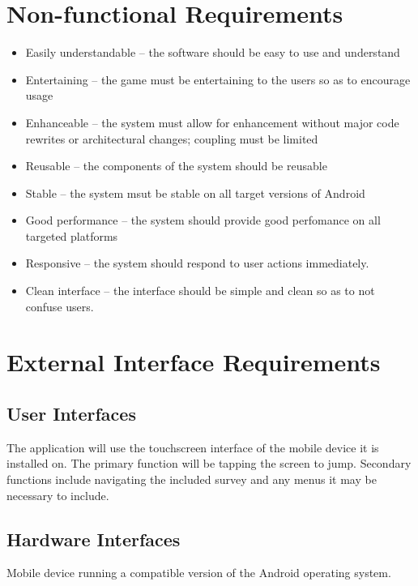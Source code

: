 \documentclass[a4wide]{article}
\begin{document}
\section{Non-functional Requirements}
\begin{itemize}
\item Easily understandable -- the software should be easy to use and understand
\item Entertaining -- the game must be entertaining to the users so as to
encourage usage
\item Enhanceable -- the system must allow for enhancement without major code
rewrites or architectural changes; coupling must be limited
\item Reusable -- the components of the system should be reusable
\item Stable -- the system msut be stable on all target versions of Android
\item Good performance -- the system should provide good perfomance on all
targeted platforms
\item Responsive -- the system should respond to user actions immediately.
\item Clean interface -- the interface should be simple and clean so as to not
confuse users.
\end{itemize}


\section{External Interface Requirements}

\subsection{User Interfaces}

The application will use the touchscreen interface of the mobile device it is installed on.  The primary function will be tapping the screen to jump.  Secondary functions include navigating the included survey and any menus it may be necessary to include.

\subsection{Hardware Interfaces}

Mobile device running a compatible version of the Android operating system.
\end{document}

